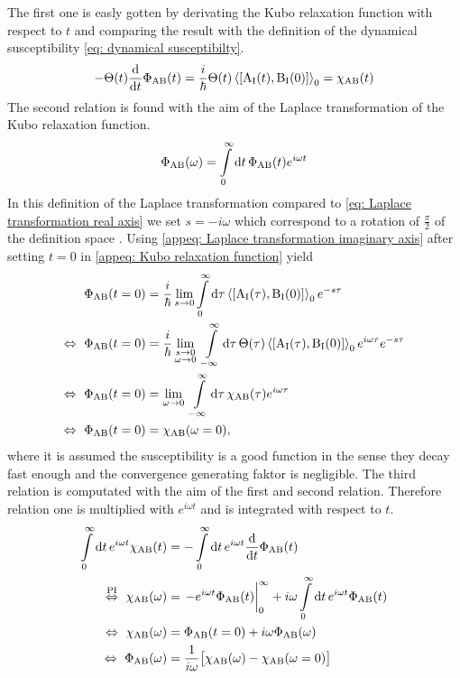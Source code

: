 The first one is easly gotten by derivating the Kubo relaxation function with respect to $t$ and comparing the result with the definition of the dynamical susceptibility \eqref{eq: dynamical susceptibilty}.
%
\begin{align}
	-\Theta(t) \dv{t} \Phi_{\mt{AB}}(t) = \frac{i}{\hbar} \Theta(t) \expval{\comm{\mt{A}_{\mt{I}}(t)}{\mt{B}_{\mt{I}}(0)}}_{0} = \chi_{\mt{AB}}(t)
\end{align}
%
The second relation is found with the aim of the Laplace transformation of the Kubo relaxation function.
%
\begin{align}
	\Phi_{\mathrm{AB}}(\omega) = \int\limits_{0}^{\infty} \dd{t} \Phi_{\mathrm{AB}}(t) e^{i\omega t}
	\label{appeq: Laplace transformation imaginary axis}
\end{align}
%
In this definition of the Laplace transformation compared to \eqref{eq: Laplace transformation real axis} we set $s = -i\omega$ which correspond to a rotation of $\frac{\pi}{2}$ of the definition space .
Using \eqref{appeq: Laplace transformation imaginary axis} after setting $t = 0$ in \eqref{appeq: Kubo relaxation function} yield
%
\begin{align}
	\Phi_{\mt{AB}}(t=0) &= \frac{i}{\hbar} \lim\limits_{s \to 0} \int\limits_{0}^{\infty} \dd{\tau} \expval{\comm{\mt{A}_{\mt{I}}(\tau)}{\mt{B}_{\mt{I}}(0)}}_{0} e^{-s\tau}
	\notag \\
	\Leftrightarrow\ \Phi_{\mt{AB}}(t=0) &= \frac{i}{\hbar} \lim\limits_{\substack{s \to 0 \\ \omega \to 0}}\ \int\limits_{-\infty}^{\infty} \dd{\tau} \Theta(\tau) \expval{\comm{\mt{A}_{\mt{I}}(\tau)}{\mt{B}_{\mt{I}}(0)}}_{0} e^{i\omega \tau} e^{-s\tau}
	\notag \\
	\Leftrightarrow\ \Phi_{\mt{AB}}(t=0) &= \lim\limits_{\omega \to 0}\ \int\limits_{-\infty}^{\infty} \dd{\tau} \chi_{\mt{AB}}(\tau) e^{i\omega \tau}
	\notag \\
	\Leftrightarrow\ \Phi_{\mt{AB}}(t=0) &= \chi_{\mt{AB}}(\omega = 0),
\end{align}
%
where it is assumed the susceptibility is a good function in the sense they decay fast enough and the convergence generating faktor is negligible.
The third relation is computated with the aim of the first and second relation.
Therefore relation one is multiplied with $e^{i\omega t}$ and is integrated with respect to $t$.
%
\begin{align}
	\int\limits_{0}^{\infty} \dd{t} e^{i\omega t} \chi_{\mt{AB}}(t)  &= - \int\limits_{0}^{\infty} \dd{t} e^{i\omega t} \dv{t} \Phi_{\mt{AB}}(t)
	\notag \\
	\overset{\mt{PI}}{\Leftrightarrow}\ \chi_{\mt{AB}}(\omega) &= \eval{-e^{i\omega t} \Phi_{\mt{AB}}(t)}_{0}^{\infty} + i\omega \int\limits_{0}^{\infty} \dd{t} e^{i\omega t} \Phi_{\mt{AB}}(t)
	\notag \\
	\Leftrightarrow\ \chi_{\mt{AB}}(\omega) &= \Phi_{\mt{AB}}(t=0) + i\omega \Phi_{\mt{AB}}(\omega)
	\notag \\
	\Leftrightarrow\ \Phi_{\mt{AB}}(\omega) &= \frac{1}{i\omega} \big[\chi_{\mt{AB}}(\omega) - \chi_{\mt{AB}}(\omega=0)\big]
\end{align}
